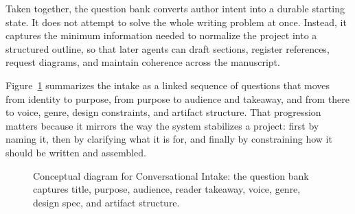 Taken together, the question bank converts author intent into a durable starting state. It does not attempt to solve the whole writing problem at once. Instead, it captures the minimum information needed to normalize the project into a structured outline, so that later agents can draft sections, register references, request diagrams, and maintain coherence across the manuscript.

Figure~\ref{fig:ch03_sec01_conversation_intake} summarizes the intake as a linked sequence of questions that moves from identity to purpose, from purpose to audience and takeaway, and from there to voice, genre, design constraints, and artifact structure. That progression matters because it mirrors the way the system stabilizes a project: first by naming it, then by clarifying what it is for, and finally by constraining how it should be written and assembled.

\begin{figure}[htbp]
\centering

\caption{Conceptual diagram for Conversational Intake: the question bank captures title, purpose, audience, reader takeaway, voice, genre, design spec, and artifact structure.}
\label{fig:ch03_sec01_conversation_intake}
\end{figure}
